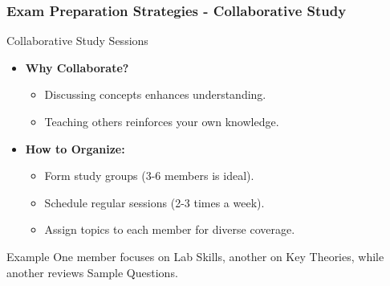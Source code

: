 \documentclass{beamer}
\begin{document}
\begin{frame}[fragile]
    \frametitle{Exam Preparation Strategies - Collaborative Study}
    \begin{block}{Collaborative Study Sessions}
        \begin{itemize}
            \item \textbf{Why Collaborate?}
                \begin{itemize}
                    \item Discussing concepts enhances understanding.
                    \item Teaching others reinforces your own knowledge.
                \end{itemize}
            \item \textbf{How to Organize:}
                \begin{itemize}
                    \item Form study groups (3-6 members is ideal).
                    \item Schedule regular sessions (2-3 times a week).
                    \item Assign topics to each member for diverse coverage.
                \end{itemize}
        \end{itemize}
    \end{block}
    \begin{block}{Example}
        One member focuses on Lab Skills, another on Key Theories, while another reviews Sample Questions.
    \end{block}
\end{frame}
\end{document}
